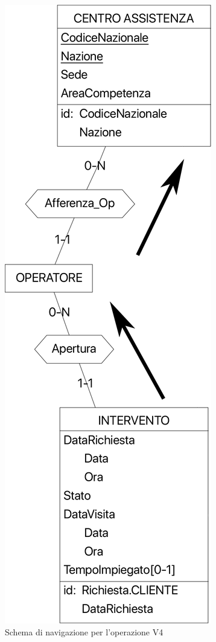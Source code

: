 \documentclass[a4paper, 12pt]{report}
\begin{document}
\begin{figure}[H]
	\centering
	\includegraphics{images/V4.png}
	\caption{Schema di navigazione per l'operazione V4}
\end{figure}
\end{document}
